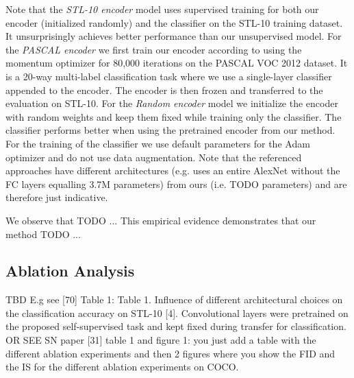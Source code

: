 \documentclass[12pt,a4paper]{article}
\begin{document}
Note that the \textit{STL-10 encoder} model uses supervised training for both our encoder (initialized randomly) and the classifier on the STL-10 training dataset. It unsurprisingly achieves better performance than our unsupervised model. For the \textit{PASCAL encoder} we first train our encoder according to \cite{PascalVocTraining} using the momentum optimizer for 80,000 iterations on the PASCAL VOC 2012 dataset. It is a 20-way multi-label classification task where we use a single-layer classifier appended to the encoder. The encoder is then frozen and transferred to the evaluation on STL-10. For the \textit{Random encoder} model we initialize the encoder with random weights and keep them fixed while training only the classifier. The classifier performs better when using the pretrained encoder from our method. For the training of the classifier we use default parameters for the Adam optimizer and do not use data augmentation. Note that the referenced approaches have different architectures (e.g. \cite{SpotArtifacts} uses an entire AlexNet without the FC layers equalling 3.7M parameters) from ours (i.e. TODO parameters) and are therefore just indicative.

We observe that TODO ... This empirical evidence demonstrates that our method TODO ...

\subsection{Ablation Analysis}
TBD
E.g see [70] Table 1:
Table 1. Influence of different architectural choices on the classification
accuracy on STL-10 [4]. Convolutional layers were pretrained
on the proposed self-supervised task and kept fixed during
transfer for classification.
OR SEE SN paper [31] table 1 and figure 1: you just add a table with the different ablation experiments and then 2 figures where you show the FID and the IS for the different ablation experiments on COCO.



\end{document}
